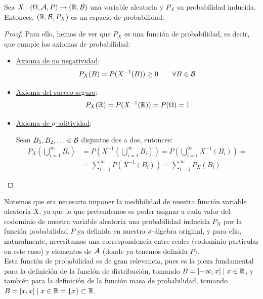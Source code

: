 \begin{prop}
    Sea $X:(\Omega, \mathcal{A}, P) \rightarrow (\mathbb R, \mathcal{B})$ una variable aleatoria y $P_X$ su probabilidad inducida.
    Entonces, $(\mathbb R, \mathcal{B}, P_X)$ es un espacio de probabilidad.
\end{prop}
\begin{proof} Para ello, hemos de ver que $P_X$ es una función de probabilidad, es decir, que cumple los axiomas de probabilidad:
    \begin{itemize}
        \item \ul{Axioma de no negatividad}:
              $$P_X(B) = P(X^{-1}(B)) \geq 0 \qquad \forall B \in \mathcal{B}$$
        \item \ul{Axioma del suceso seguro}:
              $$P_X(\mathbb R) = P(X^{-1}(\mathbb R)) = P(\Omega) = 1$$
        \item \ul{Axioma de $\sigma$-aditividad}:
        
        Sean $B_1, B_2, \ldots \in \mathcal{B}$ disjuntos dos a dos, entonces:
        \begin{align*}
            P_X\left(\bigcup\limits_{i=1}^{\infty} B_i\right) &= P\left(X^{-1}\left(\bigcup_{i=1}^{\infty} B_i\right)\right) = P\left(\bigcup_{i=1}^{\infty} X^{-1}(B_i)\right) =\\&= \sum_{i=1}^{\infty} P(X^{-1}(B_i)) = \sum_{i=1}^{\infty} P_X(B_i)
        \end{align*}
    \end{itemize}
\end{proof}

Notemos que era necesario imponer la medibilidad de nuestra función variable aleatoria $X$, ya que lo que pretendemos es poder asignar a cada valor del codominio de nuestra variable aleatoria una probabilidad inducida $P_X$ por la función probabilidad $P$ ya definida en nuestra $\sigma$-álgebra original, y para ello, naturalmente, necesitamos una correspondencia entre reales (codominio particular en este caso) y elementos de $\mathcal{A}$ (donde ya tenemos definida $P$).\\

Esta función de probabilidad es de gran relevancia, pues es la pieza fundamental para la definición de la función de distribución, tomando $B=\left]-\infty, x\right] \mid x \in \mathbb R$, y también para la definición de la función masa de probabilidad, tomando $B=[x,x] \mid x \in \mathbb R = \{x\}\subset \mathbb{R}$.\\

